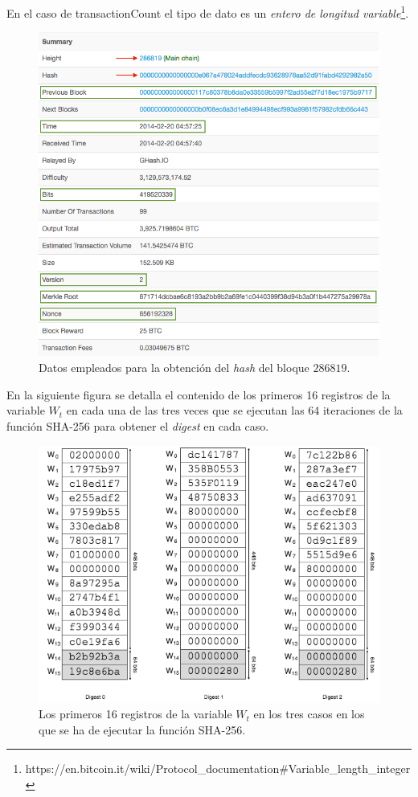 \documentclass{article}
\begin{document}
    En el caso de transactionCount el tipo de dato es un \textit{entero de longitud variable}\footnote{https://en.bitcoin.it/wiki/Protocol\_documentation\#Variable\_length\_integer}.
    
    \begin{figure}[H]
    \centering
        \includegraphics[scale=0.47]{img/Bitcoin_block_SHA_256_Block_Data}
        \caption{Datos empleados para la obtención del \textit{hash} del bloque $286819$.}
    \end{figure}
    
    \vspace{3mm}
    En la siguiente figura se detalla el contenido de los primeros 16 registros de la variable $W_{t}$ en cada una de las tres veces que se ejecutan las 64 iteraciones de la función SHA-256 para obtener el \textit{digest} en cada caso.
    \begin{figure}[H]
    \centering
        \includegraphics[scale=0.59]{img/Bitcoin_block_SHA_256_W0_W15_x3}
        \caption{Los primeros 16 registros de la variable $W_{t}$ en los tres casos en los que se ha de ejecutar la función SHA-256.}
    \end{figure}
\end{document}
